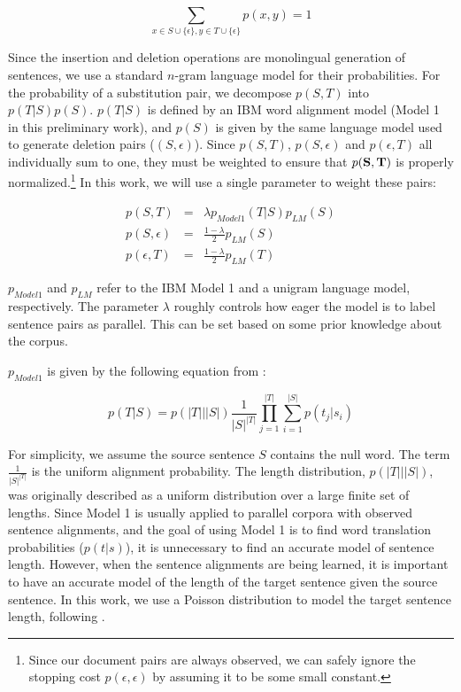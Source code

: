 \documentclass[11pt,letterpaper]{article}
\newcommand{\remove}[1]{}
\begin{document}
\begin{equation}
\sum_{x \in S\cup \{\epsilon\}, y \in T\cup \{\epsilon\}} p(x,y) = 1
\end{equation}

Since the insertion and deletion operations are monolingual generation of
sentences, we use a standard $n$-gram language model for their probabilities.
For the probability of a substitution pair, we decompose $p(S,T)$ into
$p(T|S)p(S)$. $p(T|S)$ is defined by an IBM word alignment model \cite{Brown93}
(Model 1 in this preliminary work), and $p(S)$ is given by the same language
model used to generate deletion pairs ($(S,\epsilon)$). Since $p(S,T)$,
$p(S,\epsilon)$ and $p(\epsilon,T)$ all individually sum to one, they must be
weighted to ensure that $p({\bf S},{\bf T})$ is properly
normalized.\footnote{Since our document pairs are always observed, we can safely
ignore the stopping cost $p(\epsilon, \epsilon)$ by assuming it to be some small
constant.} In this work, we will use a single parameter to weight these pairs:

\begin{align*}
p(S,T) &=& \lambda p_{Model1}(T|S) p_{LM}(S)\\
p(S,\epsilon) &=& \frac{1-\lambda}{2} p_{LM}(S)\\
p(\epsilon,T) &=& \frac{1-\lambda}{2} p_{LM}(T)
\end{align*}

$p_{Model1}$ and $p_{LM}$ refer to the IBM Model 1 and a unigram language model,
respectively. The parameter $\lambda$ roughly controls how eager the model
is to label sentence pairs as parallel. This can be set based on some prior
knowledge about the corpus.
\remove{
We will explore additional methods for setting
$\lambda$ in Section \ref{sec:extensions}.
}
$p_{Model1}$ is given by the
following equation from \cite{Brown93}:

\begin{equation}
p(T|S) = p\left(|T|\big||S|\right) \frac{1}{|S|^{|T|}}
\prod_{j=1}^{|T|} \sum_{i=1}^{|S|} p(t_j|s_i)
\end{equation}

For simplicity, we assume the source sentence $S$ contains the null word. The
term $\frac{1}{|S|^{|T|}}$ is the uniform alignment probability. The
length distribution, $p\left(|T|\big||S|\right)$, was originally described as a uniform distribution
over a large finite set of lengths. Since Model 1 is usually applied to parallel
corpora with observed sentence alignments, and the goal of using Model 1 is to
find word translation probabilities ($p(t|s)$), it is unnecessary to find an
accurate model of sentence length. However, when the sentence alignments are
being learned, it is important to have an accurate model of the length of the
target sentence given the source sentence. In this work, we use a Poisson
distribution to model the target sentence length, following .
\end{document}
